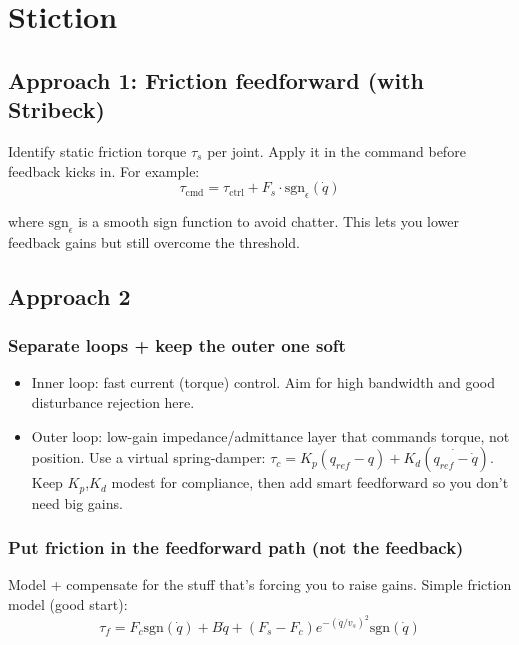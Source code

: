 \documentclass{article}
\begin{document}
\section{Stiction}

\subsection{Approach 1: Friction feedforward (with Stribeck)}

Identify static friction torque $\tau_s$ per joint. Apply it in the command before feedback kicks in.  For example:
\begin{equation}
    \tau_{\text{cmd}} = \tau_{\text{ctrl}} + F_s \cdot \text{sgn}_\epsilon(\dot{q})
\end{equation}


where $\text{sgn}_\epsilon$ is a smooth sign function to avoid chatter. This lets you lower feedback gains but still overcome the threshold.

\subsection{Approach 2}
\subsubsection{Separate loops + keep the outer one soft} 
\begin{itemize}
    \item Inner loop: fast current (torque) control. Aim for high bandwidth and good disturbance rejection here.
    \item Outer loop: low-gain impedance/admittance layer that commands torque, not position. Use a virtual spring-damper: $\tau_c = K_p(q_{ref} - q) + K_d(\dot{q_{ref} - \dot{q}})$. Keep $K_p$,$K_d$ modest for compliance, then add smart feedforward so you don’t need big gains.
\end{itemize}


\subsubsection{Put friction in the feedforward path (not the feedback)}
Model + compensate for the stuff that’s forcing you to raise gains.
Simple friction model (good start):
\begin{equation}
    \tau_f = F_c \text{sgn}(\dot{q}) + B\dot{q} + (F_s - F_c) e^{-(\dot{q}/v_s)^2} \text{sgn}(\dot{q})
\end{equation}
\end{document}
